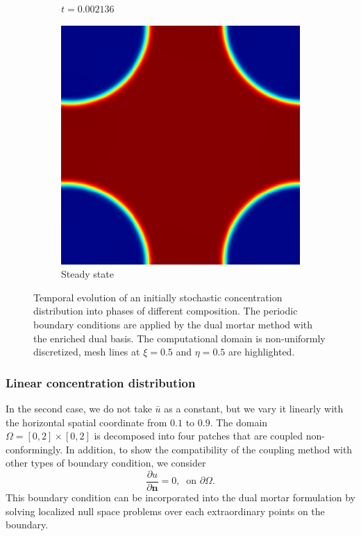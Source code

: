 \begin{figure}[ht]
\begin{subfigure}[t]{.3\linewidth}
		\vspace{-.4\baselineskip}
		\caption{{$t=0.002136$}}
	\end{subfigure}
	\begin{subfigure}[t]{.3\linewidth}
		\center
		\includegraphics[scale=.25]{stochastic_ch_8}
		\vspace{-.4\baselineskip}
		\caption{Steady state}
	\end{subfigure}
	\caption{Temporal evolution of an initially stochastic concentration distribution into phases of different composition. The periodic boundary conditions are applied by the dual mortar method with the enriched dual basis. The computational domain is non-uniformly discretized, mesh lines at $\xi=0.5$ and $\eta=0.5$ are highlighted.}\label{fig:phase_field_stochastic}
\end{figure}

\subsubsection{Linear concentration distribution}

In the second case, we do not take $\bar{u}$ as a constant, but we vary it linearly with the horizontal spatial coordinate from $0.1$ to $0.9$. The domain $\Omega = \left[ 0, 2 \right] \times \left[ 0, 2 \right]$ is decomposed into four patches that are coupled non-conformingly. In addition, to show the compatibility of the coupling method with other types of boundary condition, we consider
\begin{equation}
	\frac{ \partial u}{ \partial \mathbf{n}} = 0, \;\; \text{on }\partial \Omega.
\end{equation}
This boundary condition can be incorporated into the dual mortar formulation by solving localized null space problems over each extraordinary points on the boundary.\par

